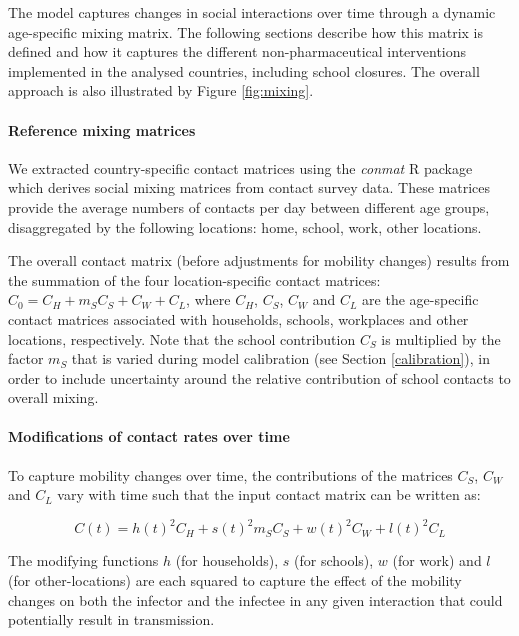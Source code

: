 The model captures changes in social interactions over time through a dynamic age-specific mixing matrix. The following
sections describe how this matrix is defined and how it captures the different non-pharmaceutical interventions implemented
in the analysed countries, including school closures. The overall approach is also illustrated by Figure \ref{fig:mixing}.

\paragraph{Reference mixing matrices}
We extracted country-specific contact matrices using the \textit{conmat} R package which derives social mixing matrices from 
contact survey data. These matrices provide the average numbers of contacts per day between different age groups, disaggregated by the following 
locations: home, school, work, other locations. 

The overall contact matrix (before adjustments for mobility changes) results from the summation of the four location-specific 
contact matrices: \(C_{0} = C_{H} + m_S C_{S} + C_{W} + C_{L}\), where \(C_{H}\), \(C_{S}\), \(C_{W}\) and \(C_{L}\) are the age-specific
contact matrices associated with households, schools, workplaces and other locations, respectively. Note that the school contribution $C_{S}$ is 
multiplied by the factor $m_S$ that is varied during model calibration (see Section \ref{calibration}), in order to include uncertainty around 
the relative contribution of school contacts to overall mixing.

\paragraph{Modifications of contact rates over time}
\label{time_var_mixing}
To capture mobility changes over time, the contributions of the matrices \(C_{S}\), \(C_{W}\) and \(C_{L}\) vary with time such that the input contact matrix can be written as:

\begin{equation}
\label{eq_mixing}
  C(t)= h(t)^{2}C_{H}+ s(t)^{2} m_S C_{S}+ w(t)^{2}C_{W}+l(t)^{2}C_{L}
\end{equation}

The modifying functions $h$ (for households), $s$ (for schools), $w$ (for work) and $l$ (for other-locations) are each squared to capture the effect of the mobility changes on 
both the infector and the infectee in any given interaction that could potentially result in transmission. 

